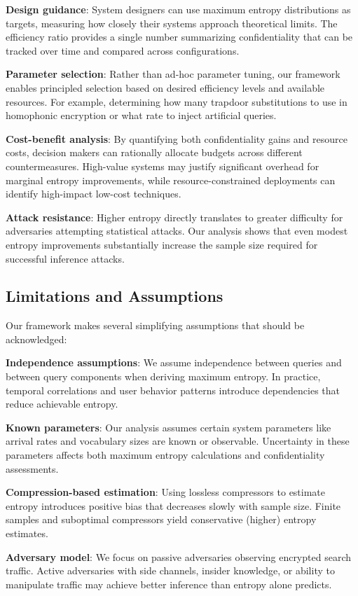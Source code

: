 \documentclass[final,11pt]{article}
\numberwithin{equation}{section}
\theoremstyle{plain}
\theoremstyle{remark}
\begin{document}
\textbf{Design guidance}: System designers can use maximum entropy distributions as targets, measuring how closely their systems approach theoretical limits. The efficiency ratio provides a single number summarizing confidentiality that can be tracked over time and compared across configurations.

\textbf{Parameter selection}: Rather than ad-hoc parameter tuning, our framework enables principled selection based on desired efficiency levels and available resources. For example, determining how many trapdoor substitutions to use in homophonic encryption or what rate to inject artificial queries.

\textbf{Cost-benefit analysis}: By quantifying both confidentiality gains and resource costs, decision makers can rationally allocate budgets across different countermeasures. High-value systems may justify significant overhead for marginal entropy improvements, while resource-constrained deployments can identify high-impact low-cost techniques.

\textbf{Attack resistance}: Higher entropy directly translates to greater difficulty for adversaries attempting statistical attacks. Our analysis shows that even modest entropy improvements substantially increase the sample size required for successful inference attacks.

\subsection{Limitations and Assumptions}
Our framework makes several simplifying assumptions that should be acknowledged:

\textbf{Independence assumptions}: We assume independence between queries and between query components when deriving maximum entropy. In practice, temporal correlations and user behavior patterns introduce dependencies that reduce achievable entropy.

\textbf{Known parameters}: Our analysis assumes certain system parameters like arrival rates and vocabulary sizes are known or observable. Uncertainty in these parameters affects both maximum entropy calculations and confidentiality assessments.

\textbf{Compression-based estimation}: Using lossless compressors to estimate entropy introduces positive bias that decreases slowly with sample size. Finite samples and suboptimal compressors yield conservative (higher) entropy estimates.

\textbf{Adversary model}: We focus on passive adversaries observing encrypted search traffic. Active adversaries with side channels, insider knowledge, or ability to manipulate traffic may achieve better inference than entropy alone predicts.
\end{document}

